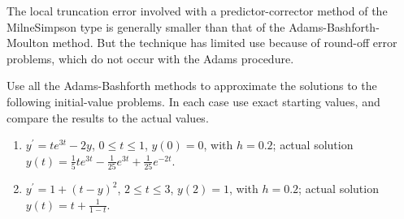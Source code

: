 The local truncation error involved with a predictor-corrector method of the MilneSimpson type is generally smaller than that of the Adams-Bashforth-Moulton method. But the technique has limited use because of round-off error problems, which do not occur with the Adams procedure.
\begin{myexercise}%
Use all the Adams-Bashforth methods to approximate the solutions to the following initial-value problems. In each case use exact starting values, and compare the results to the actual values.\\
\begin{enumerate}[label=(\alph*)]
\item $y^{\prime}=t e^{3 t}-2 y$, $0 \leq t \leq 1$, $y(0)=0$, with $h=0.2$; actual solution $y(t)=\frac{1}{5} t e^{3 t}-\frac{1}{25} e^{3 t}+\frac{1}{25} e^{-2 t}$.\\
\item $y^{\prime}=1+(t-y)^{2}$, $2 \leq t \leq 3$, $y(2)=1$, with $h=0.2$; actual solution $y(t)=t+\frac{1}{1-t}$.
\end{enumerate}


\end{myexercise}
